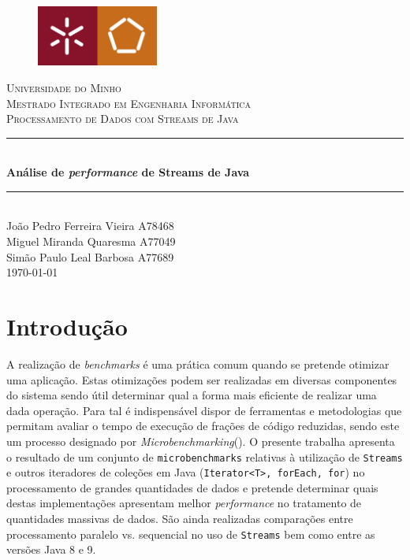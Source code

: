 \documentclass{article}
\newcommand{\titleRule}{
    \rule{\linewidth}{0.5mm} \\ [0.25cm]
}
\begin{document}
\begin{titlepage}
    \center
    \begin{figure}[H]
        \centering
        \includegraphics[width=4cm]{Pictures/UM_EENG.jpg}
    \end{figure}
    \textsc{\LARGE Universidade do Minho} \\ [1.5cm]
    \textsc{\Large Mestrado Integrado em Engenharia Informática} \\ [0.5cm]
    \textsc{\large Processamento de Dados com Streams de Java} \\ [0.5cm]

    \titleRule
    {\huge \bfseries Análise de \textit{performance} de Streams de Java}
    \titleRule

    João Pedro Ferreira Vieira A78468 \\
    Miguel Miranda Quaresma A77049 \\
    Simão Paulo Leal Barbosa A77689 \\[0.25cm]

    \today
\end{titlepage}

\tableofcontents

\newpage

\section{Introdução}
A realização de \textit{benchmarks} é uma prática comum quando se pretende otimizar uma aplicação. Estas otimizações podem ser realizadas em diversas componentes 
do sistema sendo útil determinar qual a forma mais eficiente de realizar uma dada operação. Para tal é indispensável dispor de ferramentas e metodologias que 
permitam avaliar o tempo de execução de frações de código reduzidas, sendo este um processo designado por \textit{Microbenchmarking}(\cite{microbenchmarking}).
O presente trabalha apresenta o resultado de um conjunto de \texttt{microbenchmarks} relativas à utilização de \texttt{Streams} e outros iteradores de coleções
em Java (\texttt{Iterator<T>, forEach, for}) no processamento de grandes quantidades de dados e pretende determinar quais destas implementações apresentam melhor 
\textit{performance} no tratamento de quantidades massivas de dados. São ainda realizadas comparações entre processamento paralelo vs. sequencial no uso de 
\texttt{Streams} bem como entre as versões Java 8 e 9.
\end{document}
